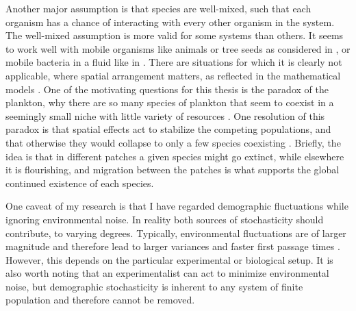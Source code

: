 Another major assumption is that species are well-mixed, such that each organism has a chance of interacting with every other organism in the system. 
The well-mixed assumption is more valid for some systems than others. 
It seems to work well with mobile organisms like animals or tree seeds as considered in \cite{Hubbell2001}, or mobile bacteria in a fluid like in \cite{Gore2009,Frey2010,Posfai2017,Abreu2019}. %
There are situations for which it is clearly not applicable, where spatial arrangement matters, as reflected in the mathematical models \cite{Durrett1994,Peterson1997,Tilman1997,Haydon2001,Houchmandzadeh2002,Korolev2011}. 
One of the motivating questions for this thesis is the paradox of the plankton, why there are so many species of plankton that seem to coexist in a seemingly small niche with little variety of resources \cite{Hutchinson1961}. 
One resolution of this paradox is that spatial effects act to stabilize the competing populations, and that otherwise they would collapse to only a few species coexisting \cite{Roy2007}. 
Briefly, the idea is that in different patches a given species might go extinct, while elsewhere it is flourishing, and migration between the patches is what supports the global continued existence of each species. 

One caveat of my research is that I have regarded demographic fluctuations while ignoring environmental noise. 
In reality both sources of stochasticity should contribute, to varying degrees. 
Typically, environmental fluctuations are of larger magnitude and therefore lead to larger variances and faster first passage times \cite{Ovaskainen2010}. 
However, this depends on the particular experimental or biological setup. 
It is also worth noting that an experimentalist can act to minimize environmental noise, but demographic stochasticity is inherent to any system of finite population and therefore cannot be removed. 

